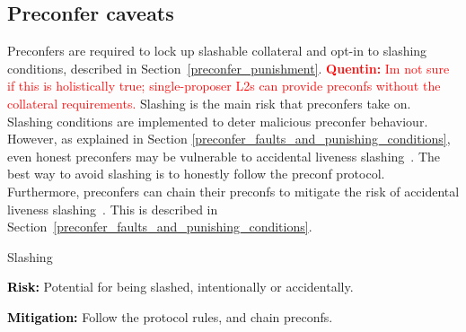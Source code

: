 \documentclass[a4paper]{article}
\theoremstyle{boldstyle}
\newlength{\entrysep}
\newcommand{\risk}[1]{\par\noindent\textbf{\textcolor{black}{Risk:}} #1\par\vspace{\entrysep}}
\newcommand{\mitigation}[1]{\par\noindent\textbf{\textcolor{black}{Mitigation:}} #1}
\newcommand{\qb}[1]{\textcolor{red}{\textbf{Quentin:} #1}}
\begin{document}
    \subsection{Preconfer caveats} \label{preconfer_caveats}

        Preconfers are required to lock up slashable collateral and opt-in to slashing conditions, described in Section~\ref{preconfer_punishment}. \qb{Im not sure if this is holistically true; single-proposer L2s can provide preconfs without the collateral requirements.} Slashing is the main risk that preconfers take on. Slashing conditions are implemented to deter malicious preconfer behaviour. However, as explained in Section \ref{preconfer_faults_and_punishing_conditions}, even honest preconfers may be vulnerable to accidental liveness slashing~\cite{W:AvoidingAccidentalLivenessFaultsforBasedPreconfs}.
        The best way to avoid slashing is to honestly follow the preconf protocol. Furthermore, preconfers can chain their preconfs to mitigate the risk of accidental liveness slashing~\cite{W:AvoidingAccidentalLivenessFaultsforBasedPreconfs}. This is described in Section~\ref{preconfer_faults_and_punishing_conditions}.
        \begin{riskbox}{Slashing}
            \risk{Potential for being slashed, intentionally or accidentally.}
            \mitigation{Follow the protocol rules, and chain preconfs.}
        \end{riskbox}
        
\end{document}
